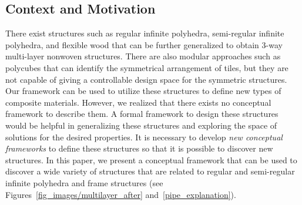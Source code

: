 \documentclass[times,twocolumn,final]{elsarticle}
\begin{document}
\subsection{Context and Motivation}
\label{Sec_ContextandMotivation}

There exist structures such as regular infinite polyhedra\cite{coxeter1938regular}, semi-regular infinite polyhedra\cite{wachman1974infinitepolyhedra, grunbaum1993infinite}, and flexible wood that can be further generalized to obtain 3-way multi-layer nonwoven structures. There are also modular approaches such as polycubes \cite{gambini2012polycubenonlattice, hochberg20002nothcedtiling} that can identify the symmetrical arrangement of tiles, but they are not capable of giving a controllable design space for the symmetric structures. Our framework can be used to utilize these structures to define new types of composite materials. However, we realized that there exists no conceptual framework to describe them. A formal framework to design these structures would be helpful in generalizing these structures and exploring the space of solutions for the desired properties. It is necessary to develop \textit{new conceptual frameworks} to define these structures so that it is possible to discover new structures. In this paper, we present a conceptual framework that can be used to discover a wide variety of structures that are related to regular and semi-regular infinite polyhedra and frame structures (see Figures~\ref{fig_images/multilayer_after} and~\ref{pipe_explanation}).
\end{document}
